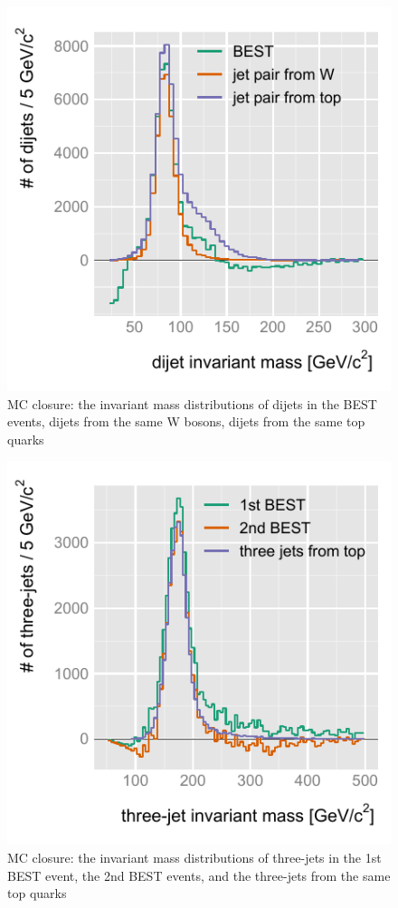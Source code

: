 \begin{figure}[!h]
 \begin{center}
  \includegraphics[scale=1.]{figs/best/c110506_s0102_g031_02}
 \caption{MC closure: the invariant mass distributions of dijets in the
 BEST events, dijets from the same W bosons, dijets from the same top
 quarks}
 \label{101357_31Dec11}
 \end{center}
\end{figure}

\begin{figure}[!h]
 \begin{center}
  \includegraphics[scale=1.]{figs/best/c110506_s0102_g041_02}
 \caption{MC closure: the invariant mass distributions of three-jets in
  the 1st BEST event, the 2nd BEST events, and the three-jets from the
  same top quarks}
 \label{101404_31Dec11}
 \end{center}
\end{figure}

